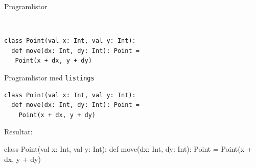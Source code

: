 \begin{Slide}{Programlistor}\SlideFontSmall
  \vspace{.5em}

  \begin{itemize}
  \end{itemize}

  \halfblankline
\begin{exlatex}
\usepackage{fancyvrb}
\end{exlatex}

~\vspace{1em}

\begin{exlatex}

{\small
\begin{verbatim}
class Point(val x: Int, val y: Int):
  def move(dx: Int, dy: Int): Point = 
   Point(x + dx, y + dy)

\end{verbatim}
}  
\end{exlatex}

\end{Slide}

\begin{Slide}{Programlistor med \texttt{listings}} \SlideFontSmall
  \begin{itemize}
  \end{itemize}

  \begin{exlatex}
\lstset{
  language=Scala,
  basicstyle=\ttfamily\small,
}

\begin{lstlisting}
class Point(val x: Int, val y: Int):
  def move(dx: Int, dy: Int): Point = 
    Point(x + dx, y + dy)
\end{lstlisting}
\end{exlatex}

Resultat:

\begin{Code}
class Point(val x: Int, val y: Int):
  def move(dx: Int, dy: Int): Point = 
    Point(x + dx, y + dy)
\end{Code}

\end{Slide}


